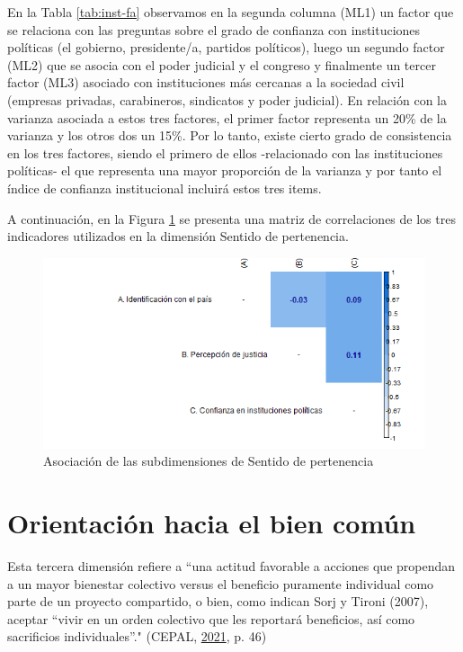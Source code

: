 \documentclass[
  12pt,
]{book}
\begin{document}
En la Tabla \ref{tab:inst-fa} observamos en la segunda columna (ML1) un factor que se relaciona con las preguntas sobre el grado de confianza con instituciones políticas (el gobierno, presidente/a, partidos políticos), luego un segundo factor (ML2) que se asocia con el poder judicial y el congreso y finalmente un tercer factor (ML3) asociado con instituciones más cercanas a la sociedad civil (empresas privadas, carabineros, sindicatos y poder judicial). En relación con la varianza asociada a estos tres factores, el primer factor representa un 20\% de la varianza y los otros dos un 15\%. Por lo tanto, existe cierto grado de consistencia en los tres factores, siendo el primero de ellos -relacionado con las instituciones políticas- el que representa una mayor proporción de la varianza y por tanto el índice de confianza institucional incluirá estos tres items.

A continuación, en la Figura \ref{fig:sentido-pertenencia} se presenta una matriz de correlaciones de los tres indicadores utilizados en la dimensión Sentido de pertenencia.

\begin{figure}[H]

{\centering \includegraphics[width=1\linewidth,height=1\textheight]{output/graphs/pertenencia_cor} 

}

\caption{Asociación de las subdimensiones de Sentido de pertenencia}\label{fig:sentido-pertenencia}
\end{figure}

\hypertarget{orientaciuxf3n-hacia-el-bien-comuxfan}{%
\section{Orientación hacia el bien común}\label{orientaciuxf3n-hacia-el-bien-comuxfan}}

Esta tercera dimensión refiere a ``una actitud favorable a acciones que propendan a un mayor bienestar colectivo versus el beneficio puramente individual como parte de un proyecto compartido, o bien, como indican Sorj y Tironi (2007), aceptar ``vivir en un orden colectivo que les reportará beneficios, así como sacrificios individuales''." (CEPAL, \protect\hyperlink{ref-cepal_cohesion_2021}{2021}, p. 46)
\end{document}
